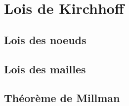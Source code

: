 \chapter{Lois de Kirchhoff}

\section{Lois des noeuds}

\section{Lois des mailles}

\section{Théorème de Millman}

